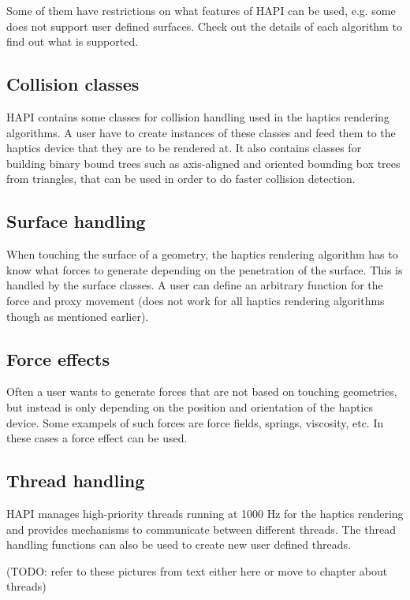 Some of them have restrictions on what features of HAPI can be used,
e.g. some does not support user defined surfaces. Check out the
details of each algorithm to find out what is supported.

\subsection{Collision classes}
HAPI contains some classes for collision handling used in the
haptics rendering algorithms. A user have to create instances of these
classes and feed them to the haptics device that they are to be
rendered at. It also contains classes for building binary bound trees
such as axis-aligned and oriented bounding box trees from triangles,
that can be used in order to do faster collision detection. 

\subsection{Surface handling}
When touching the surface of a geometry, the haptics rendering
algorithm has to know what forces to generate depending on the
penetration of the surface. This is handled by the surface classes. A
user can define an arbitrary function for the force and proxy
movement (does not work for all haptics rendering algorithms though as
mentioned earlier).

\subsection{Force effects}
Often a user wants to generate forces that are not based on
touching geometries, but instead is only depending on the position and
orientation of the haptics device. Some exampels of such forces are force fields,
springs, viscosity, etc. In these cases a force effect can be used.

\subsection{Thread handling}
HAPI manages high-priority threads running at 1000 Hz for the haptics
rendering and provides mechanisms to communicate between different
threads. The thread handling functions can also be used to create new
user defined threads.      

(TODO: refer to these pictures from text either here or move to chapter about threads)


